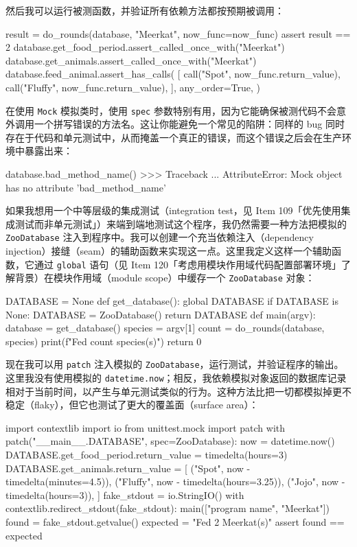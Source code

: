 然后我可以运行被测函数，并验证所有依赖方法都按预期被调用：

\begin{codebox}[python]
result = do_rounds(database, "Meerkat", now_func=now_func)
assert result == 2
database.get_food_period.assert_called_once_with("Meerkat")
database.get_animals.assert_called_once_with("Meerkat")
database.feed_animal.assert_has_calls(
    [
        call("Spot", now_func.return_value),
        call("Fluffy", now_func.return_value),
    ],
    any_order=True,
)
\end{codebox}

在使用 \texttt{Mock} 模拟类时，使用 \texttt{spec} 参数特别有用，因为它能确保被测代码不会意外调用一个拼写错误的方法名。这让你能避免一个常见的陷阱：同样的 bug 同时存在于代码和单元测试中，从而掩盖一个真正的错误，而这个错误之后会在生产环境中暴露出来：

\begin{codebox}[python]
database.bad_method_name()
>>>
Traceback ...
AttributeError: Mock object has no attribute 'bad_method_name'
\end{codebox}

如果我想用一个中等层级的集成测试（integration test，见 Item 109「优先使用集成测试而非单元测试」）来端到端地测试这个程序，我仍然需要一种方法把模拟的 \texttt{ZooDatabase} 注入到程序中。我可以创建一个充当依赖注入（dependency injection）接缝（seam）的辅助函数来实现这一点。这里我定义这样一个辅助函数，它通过 \texttt{global} 语句（见 Item 120「考虑用模块作用域代码配置部署环境」了解背景）在模块作用域（module scope）中缓存一个 \texttt{ZooDatabase} 对象：

\begin{codebox}[python]
DATABASE = None
def get_database():
    global DATABASE
    if DATABASE is None:
        DATABASE = ZooDatabase()
    return DATABASE
def main(argv):
    database = get_database()
    species = argv[1]
    count = do_rounds(database, species)
    print(f"Fed {count} {species}(s)")
    return 0
\end{codebox}

现在我可以用 \texttt{patch} 注入模拟的 \texttt{ZooDatabase}，运行测试，并验证程序的输出。这里我没有使用模拟的 \texttt{datetime.now}；相反，我依赖模拟对象返回的数据库记录相对于当前时间，以产生与单元测试类似的行为。这种方法比把一切都模拟掉更不稳定（flaky），但它也测试了更大的覆盖面（surface area）：

\begin{codebox}[python]
import contextlib
import io
from unittest.mock import patch
with patch("__main__.DATABASE", spec=ZooDatabase):
    now = datetime.now()
    DATABASE.get_food_period.return_value = timedelta(hours=3)
    DATABASE.get_animals.return_value = [
        ("Spot", now - timedelta(minutes=4.5)),
        ("Fluffy", now - timedelta(hours=3.25)),
        ("Jojo", now - timedelta(hours=3)),
    ]
    fake_stdout = io.StringIO()
    with contextlib.redirect_stdout(fake_stdout):
        main(["program name", "Meerkat"])
    found = fake_stdout.getvalue()
    expected = "Fed 2 Meerkat(s)\n"
    assert found == expected
\end{codebox}

